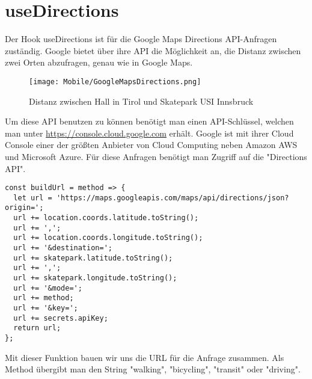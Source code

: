 \section{useDirections}
Der Hook useDirections ist für die Google Maps Directions API-Anfragen zuständig. Google bietet über
ihre API die Möglichkeit an, die Distanz zwischen zwei Orten abzufragen, genau wie in Google Maps.

\begin{figure}[H]
  \begin{center}
    \texttt{[image: Mobile/GoogleMapsDirections.png]}
    \caption{Distanz zwischen Hall in Tirol und Skatepark USI Innsbruck}
  \end{center}
\end{figure}

\label{apikey}
Um diese API benutzen zu können benötigt man einen API-Schlüssel, welchen man unter
\url{https://console.cloud.google.com} erhält. Google ist mit ihrer Cloud Console einer der größten
Anbieter von Cloud Computing neben Amazon AWS und Microsoft Azure. Für diese Anfragen benötigt man
Zugriff auf die "Directions API".

\begin{lstlisting}
const buildUrl = method => {
  let url = 'https://maps.googleapis.com/maps/api/directions/json?origin=';
  url += location.coords.latitude.toString();
  url += ',';
  url += location.coords.longitude.toString();
  url += '&destination=';
  url += skatepark.latitude.toString();
  url += ',';
  url += skatepark.longitude.toString();
  url += '&mode=';
  url += method;
  url += '&key=';
  url += secrets.apiKey;
  return url;
};
\end{lstlisting}

Mit dieser Funktion bauen wir uns die URL für die Anfrage zusammen. Als Method übergibt man den
String "walking", "bicycling", "transit" oder "driving".
